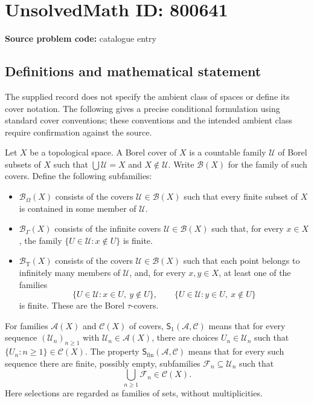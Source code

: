 \documentclass[11pt]{article}
\begin{document}
\section*{UnsolvedMath ID: 800641}
\textbf{Source problem code:} catalogue entry
\subsection{Definitions and mathematical statement}
The supplied record does not specify the ambient class of spaces or define its cover notation. The following gives a precise conditional formulation using standard cover conventions; these conventions and the intended ambient class require confirmation against the source.

Let \(X\) be a topological space. A Borel cover of \(X\) is a countable family \(\mathcal U\) of Borel subsets of \(X\) such that \(\bigcup\mathcal U=X\) and \(X\notin\mathcal U\). Write \(\mathcal B(X)\) for the family of such covers. Define the following subfamilies:
\begin{itemize}
\item \(\mathcal B_\Omega(X)\) consists of the covers \(\mathcal U\in\mathcal B(X)\) such that every finite subset of \(X\) is contained in some member of \(\mathcal U\).
\item \(\mathcal B_\Gamma(X)\) consists of the infinite covers \(\mathcal U\in\mathcal B(X)\) such that, for every \(x\in X\), the family \(\{U\in\mathcal U:x\notin U\}\) is finite.
\item \(\mathcal B_{\mathrm T}(X)\) consists of the covers \(\mathcal U\in\mathcal B(X)\) such that each point belongs to infinitely many members of \(\mathcal U\), and, for every \(x,y\in X\), at least one of the families
\[
\{U\in\mathcal U:x\in U,\ y\notin U\},\qquad
\{U\in\mathcal U:y\in U,\ x\notin U\}
\]
is finite. These are the Borel \(\tau\)-covers.
\end{itemize}
For families \(\mathcal A(X)\) and \(\mathcal C(X)\) of covers, \(\mathsf S_1(\mathcal A,\mathcal C)\) means that for every sequence \((\mathcal U_n)_{n\geq1}\) with \(\mathcal U_n\in\mathcal A(X)\), there are choices \(U_n\in\mathcal U_n\) such that \(\{U_n:n\geq1\}\in\mathcal C(X)\). The property \(\mathsf S_{\mathrm{fin}}(\mathcal A,\mathcal C)\) means that for every such sequence there are finite, possibly empty, subfamilies \(\mathcal F_n\subseteq\mathcal U_n\) such that
\[
\bigcup_{n\geq1}\mathcal F_n\in\mathcal C(X).
\]
Here selections are regarded as families of sets, without multiplicities.
\end{document}
